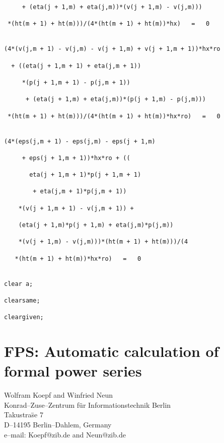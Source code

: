\documentclass[11pt,letterpaper]{book}
\makeatletter
\newcommand{\underscore}{\_}
\newcommand{\ttindex}[1]{{\renewcommand{\_}{\protect\underscore}%
                          \index{#1@{\tt #1}}}}
\makeatother
\begin{document}
{\begin{verbatim}
     + (eta(j + 1,m) + eta(j,m))*(v(j + 1,m) - v(j,m)))

 *(ht(m + 1) + ht(m)))/(4*(ht(m + 1) + ht(m))*hx)   =   0


(4*(v(j,m + 1) - v(j,m) - v(j + 1,m) + v(j + 1,m + 1))*hx*ro

  + ((eta(j + 1,m + 1) + eta(j,m + 1))

     *(p(j + 1,m + 1) - p(j,m + 1))

      + (eta(j + 1,m) + eta(j,m))*(p(j + 1,m) - p(j,m)))

 *(ht(m + 1) + ht(m)))/(4*(ht(m + 1) + ht(m))*hx*ro)   =   0


(4*(eps(j,m + 1) - eps(j,m) - eps(j + 1,m)

     + eps(j + 1,m + 1))*hx*ro + ((

       eta(j + 1,m + 1)*p(j + 1,m + 1)

        + eta(j,m + 1)*p(j,m + 1))

    *(v(j + 1,m + 1) - v(j,m + 1)) +

    (eta(j + 1,m)*p(j + 1,m) + eta(j,m)*p(j,m))

    *(v(j + 1,m) - v(j,m)))*(ht(m + 1) + ht(m)))/(4

   *(ht(m + 1) + ht(m))*hx*ro)   =   0


clear a;

clearsame;

cleargiven;
\end{verbatim}}

\chapter[FPS: Formal power series]%
        {FPS: Automatic calculation of formal power series}
\label{FPS}

{\footnotesize
\begin{center}
Wolfram Koepf and Winfried Neun\\
Konrad--Zuse--Zentrum f\"ur Informationstechnik Berlin \\
Takustra\"se 7 \\
D--14195 Berlin--Dahlem, Germany \\[0.05in]
e--mail: Koepf@zib.de and Neun@zib.de
\end{center}
}

\ttindex{FPS}
\end{document}
